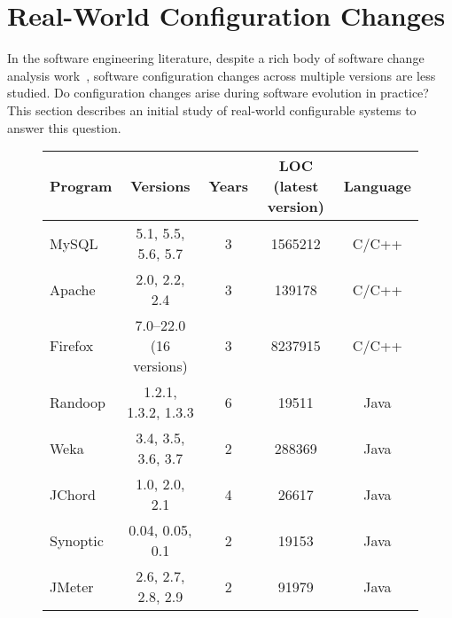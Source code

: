 \section{Real-World Configuration Changes}
\label{sec:study}

In the software engineering literature, despite a rich body of
software change analysis work~\cite{STVR:STVR1475, Dagenais:2008, Tao:2012:SEU}, 
software configuration changes across multiple
versions are less studied. Do configuration
changes arise during software evolution in practice?
This section describes an initial study of
\studysubjnum  real-world configurable systems to answer
this question.



\begin{figure}[t]
\vspace{1mm}
\centering
\small{
\setlength{\tabcolsep}{.40\tabcolsep}
\begin{tabular}{|l||c|c|c|c|}
\hline
 Program & Versions & Years & LOC (latest version)  & Language\\
 \hline
 \hline
 MySQL & 5.1, 5.5, 5.6, 5.7 & 3 &1565212& C/C++\\
 Apache& 2.0, 2.2, 2.4 & 3  & 139178 &C/C++\\
 Firefox& 7.0--22.0 (16 versions) & 3  & 8237915&C/C++\\
 Randoop & 1.2.1, 1.3.2, 1.3.3 & 6 & 19511   &Java\\
 Weka & 3.4, 3.5, 3.6, 3.7  & 2  & 288369 &Java\\
 JChord & 1.0, 2.0, 2.1 &  4 & 26617  &Java\\
 Synoptic & 0.04, 0.05, 0.1 & 2   & 19153 &Java\\
 JMeter & 2.6, 2.7, 2.8, 2.9& 2   & 91979 &Java\\
\hline
\end{tabular}
}
\vspace{-2mm}
\end{figure}


